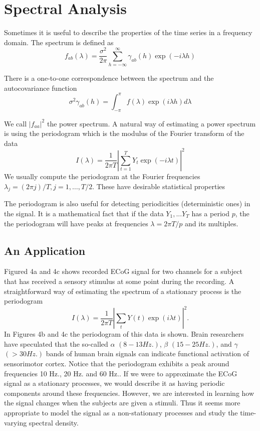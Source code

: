 \section{Spectral Analysis}

Sometimes it is useful to describe the properties of the time series
in a frequency domain. The spectrum is defined as 
\[
f_{ab}(\lambda) = \frac{\sigma^2}{2\pi} \sum_{h = -\infty}^{\infty} \gamma_{ab}(h) \exp
( -i \lambda h)
\]

There is a one-to-one correspondence between the spectrum and the
autocovariance function 
\[
\sigma^2 \gamma_{ab}(h) = \int_{-\pi}^{\pi} f(\lambda) \exp ( i\lambda h) d\lambda
\]

We call $|f_{aa}|^2$ the power spectrum. A natural way of estimating a
power 
spectrum is using the periodogram which 
is the modulus of the Fourier transform of the data
\[
I(\lambda) = \frac{1}{2\pi T} | \sum_{t=1}^T Y_t \exp (-i \lambda t) |^2
\]
We usually compute the periodogram at the Fourier frequencies
$\lambda_j = (2 \pi j)/T, j=1,\dots,T/2$. These have desirable
statistical properties

The periodogram is also useful for detecting periodicities
(deterministic ones) in the signal. It is a mathematical fact that if
the data $Y_1,...Y_T$ has a period $p$, the the periodogram will have
peaks at frequencies $\lambda = 2 \pi T/p$ and its multiples. 

\centerline{}


\subsection{An Application}
Figured 4a and 4c shows recorded ECoG signal for two channels for
a subject that has received a sensory stimulus at some point
during the recording. A straightforward way of estimating the
spectrum of a stationary process is the periodogram
\[
I(\lambda) = \frac{1}{2\pi T} \left| \sum_t Y(t) \exp(i\lambda t)
\right|^2.\]
In Figures 4b and 4c the periodogram of this data is shown. Brain
researchers have speculated that the so-called $\alpha$ $(8-13
Hz.)$, $\beta$ $(15-25 Hz.)$, and $\gamma$ $(>30 Hz.)$ bands of
human brain signals can indicate functional activation of
sensorimotor cortex. Notice that the
periodogram exhibits a peak around frequencies 10 Hz., 20 Hz. and
60 Hz.. If we were to approximate the ECoG signal as a stationary
processes, we would describe it as having periodic components
around these frequencies. However, we are interested in learning
how the signal changes when the subjects are given a stimuli. Thus
it seems more appropriate to model the signal as a non-stationary
processes and study the time-varying spectral density.

